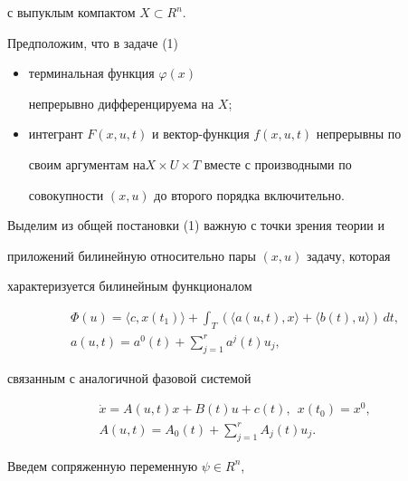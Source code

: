 с выпуклым компактом $X \subset R^{n}$.





Предположим, что в задаче (1)


\begin{itemize}


\item[1)] терминальная функция $\varphi(x)$ 


непрерывно дифференцируема на $X$;


\item[2)] интегрант $F(x,u,t)$ и вектор-функция $f(x,u,t)$ непрерывны по


своим аргументам на\linebreak $X \times U \times T$ вместе с производными по


совокупности $(x,u)$ до второго порядка включительно.


\end{itemize}





Выделим из общей постановки (1) важную с точки зрения теории и 


приложений билинейную относительно пары $(x,u)$ задачу, которая 


характеризуется билинейным функционалом


\begin{gather*}


\Phi(u) = \langle c, x(t_{1})\rangle + 


\int_{T}(\langle a(u, t), x\rangle + \langle b(t),u\rangle)\,dt, \\


%


a(u, t) = a^{0}(t) + \sum_{j = 1}^{r} a^{j}(t)u_{j},


\end{gather*}


связанным с аналогичной фазовой системой


\begin{gather*}


\Dot{x} = A(u, t)x + B(t)u + c(t),\ \ x(t_{0}) = x^{0}, \\


A(u, t) = A_{0}(t) + \sum_{j = 1}^{r} A_{j}(t)u_{j}.


\end{gather*}





Введем сопряженную переменную $\psi \in R^{n}$,


